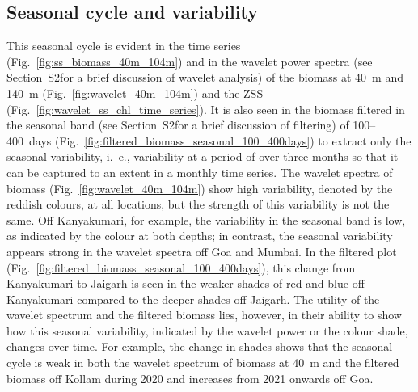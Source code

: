 \documentclass[authoryear,review,11pt]{elsarticle}
\newcommand{\chla}{chl-{\emph{a}}}
\providecommand{\DIFaddtex}[1]{{\protect\color{blue}\uwave{#1}}} %
\providecommand{\DIFaddbegin}{} %
\providecommand{\DIFaddend}{} %
\providecommand{\DIFadd}[1]{\texorpdfstring{\DIFaddtex{#1}}{#1}} %
\begin{document}
%


\subsection{Seasonal cycle and variability}
\label{sec:seasonal.zss}

This seasonal cycle is evident in the time series (Fig.~\ref{fig:ss_biomass_40m_104m}) and in the wavelet power spectra (see Section~S2\DIFaddbegin \DIFadd{.1 }\DIFaddend for a brief discussion of wavelet analysis) of the biomass at 40~m and 140~m (Fig.~\ref{fig:wavelet_40m_104m}) and the ZSS (Fig.~\ref{fig:wavelet_ss_chl_time_series}).  It is also seen in the biomass filtered in the seasonal band (see Section~S2\DIFaddbegin \DIFadd{.2 }\DIFaddend for a brief discussion of filtering) of 100--400~days (Fig.~\ref{fig:filtered_biomass_seasonal_100_400days}) to extract only the seasonal variability, i.~e., variability at a period of over three months so that it can be captured to an extent in a monthly time series.  The wavelet spectra of biomass (Fig.~\ref{fig:wavelet_40m_104m}) show high variability, denoted by the reddish colours, at all locations, but the strength of this variability is not the same.  Off Kanyakumari, for example, the variability in the seasonal band is low, as indicated by the colour at both depths; in contrast, the seasonal variability appears strong in the wavelet spectra off Goa and Mumbai.  In the filtered plot (Fig.~\ref{fig:filtered_biomass_seasonal_100_400days}), this change from Kanyakumari to Jaigarh is seen in the weaker shades of red and blue off Kanyakumari compared to the deeper shades off Jaigarh. The utility of the wavelet spectrum and the filtered biomass lies, however, in their ability to show how this seasonal variability, indicated by the wavelet power or the colour shade, changes over time.  For example, the change in shades shows that the seasonal cycle is weak in both the wavelet spectrum of biomass at 40~m and the filtered biomass off Kollam during 2020 and increases from 2021 onwards off Goa. 
\end{document}
